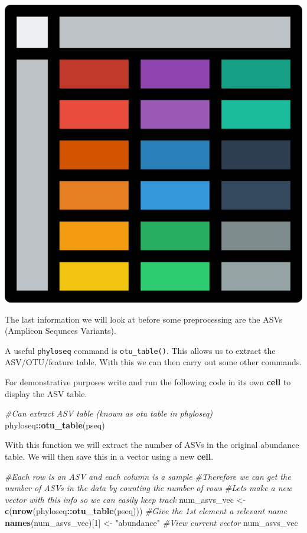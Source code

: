 \documentclass[
]{book}
\newenvironment{Shaded}{\begin{snugshade}}{\end{snugshade}}
\newcommand{\CommentTok}[1]{\textcolor[rgb]{0.56,0.35,0.01}{\textit{#1}}}
\newcommand{\DecValTok}[1]{\textcolor[rgb]{0.00,0.00,0.81}{#1}}
\newcommand{\FunctionTok}[1]{\textcolor[rgb]{0.13,0.29,0.53}{\textbf{#1}}}
\newcommand{\NormalTok}[1]{#1}
\newcommand{\OtherTok}[1]{\textcolor[rgb]{0.56,0.35,0.01}{#1}}
\newcommand{\SpecialCharTok}[1]{\textcolor[rgb]{0.81,0.36,0.00}{\textbf{#1}}}
\newcommand{\StringTok}[1]{\textcolor[rgb]{0.31,0.60,0.02}{#1}}
\begin{document}
\includegraphics{figures/nice_table.png}

The last information we will look at before some preprocessing are the ASVs (Amplicon Sequnces Variants).

A useful \texttt{phyloseq} command is \texttt{otu\_table()}. This allows us to extract the ASV/OTU/feature table. With this we can then carry out some other commands.

For demonstrative purposes write and run the following code in its own \textbf{cell} to display the ASV table.

\begin{Shaded}
\begin{Highlighting}[]
\CommentTok{\#Can extract ASV table (known as otu table in phyloseq)}
\NormalTok{phyloseq}\SpecialCharTok{::}\FunctionTok{otu\_table}\NormalTok{(pseq)}
\end{Highlighting}
\end{Shaded}

With this function we will extract the number of ASVs in the original abundance table.
We will then save this in a vector using a new \textbf{cell}.

\begin{Shaded}
\begin{Highlighting}[]
\CommentTok{\#Each row is an ASV and each column is a sample}
\CommentTok{\#Therefore we can get the number of ASVs in the data by counting the number of rows}
\CommentTok{\#Let\textquotesingle{}s make a new vector with this info so we can easily keep track}
\NormalTok{num\_asvs\_vec }\OtherTok{\textless{}{-}} \FunctionTok{c}\NormalTok{(}\FunctionTok{nrow}\NormalTok{(phyloseq}\SpecialCharTok{::}\FunctionTok{otu\_table}\NormalTok{(pseq)))}
\CommentTok{\#Give the 1st element a relevant name}
\FunctionTok{names}\NormalTok{(num\_asvs\_vec)[}\DecValTok{1}\NormalTok{] }\OtherTok{\textless{}{-}} \StringTok{"abundance"}
\CommentTok{\#View current vector}
\NormalTok{num\_asvs\_vec}
\end{Highlighting}
\end{Shaded}
\end{document}
